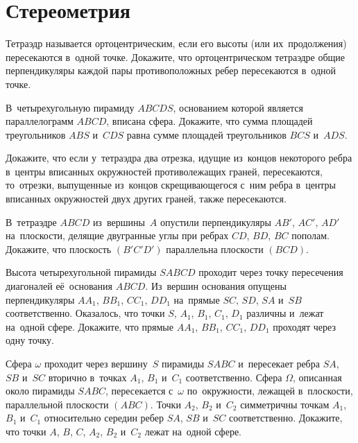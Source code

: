 
\section*{Стереометрия}


\begin{problems}

\item
Тетраэдр называется ортоцентрическим, если его высоты (или их~продолжения)
пересекаются в~одной точке.
Докажите, что ортоцентрическом тетраэдре общие перпендикуляры каждой пары
противоположных ребер пересекаются в~одной точке.

\item
В~четырехугольную пирамиду $ABCDS$, основанием которой является параллелограмм
$ABCD$, вписана сфера.
Докажите, что сумма площадей треугольников $ABS$ и~$CDS$ равна сумме площадей
треугольников $BCS$ и~$ADS$.

\item
Докажите, что если у~тетраэдра два отрезка, идущие из~концов некоторого ребра
в~центры вписанных окружностей противолежащих граней, пересекаются, то~отрезки,
выпущенные из~концов скрещивающегося с~ним ребра в~центры вписанных окружностей
двух других граней, также пересекаются.

\item
В~тетраэдре $ABCD$ из~вершины~$A$ опустили перпендикуляры $AB'$, $AC'$, $AD'$
на~плоскости, делящие двугранные углы при ребрах $CD$, $BD$, $BC$ пополам.
Докажите, что плоскость $(B'C'D')$ параллельна плоскости $(BCD)$.

\item
Высота четырехугольной пирамиды $SABCD$ проходит через точку пересечения
диагоналей её~основания $ABCD$.
Из~вершин основания опущены перпендикуляры $A A_1$, $B B_1$, $C C_1$, $D D_1$
на~прямые $SC$, $SD$, $SA$ и~$SB$ соответственно.
Оказалось, что точки $S$, $A_1$, $B_1$, $C_1$, $D_1$ различны и~лежат на~одной
сфере.
Докажите, что прямые $A A_1$, $B B_1$, $C C_1$, $D D_1$ проходят через одну
точку.

\item
Сфера $\omega$ проходит через вершину~$S$ пирамиды $SABC$ и~пересекает ребра
$SA$, $SB$ и~$SC$ вторично в~точках $A_1$, $B_1$ и~$C_1$ соответственно.
Сфера $\Omega$, описанная около пирамиды $SABC$, пересекается с~$\omega$
по~окружности, лежащей в~плоскости, параллельной плоскости $(ABC)$.
Точки $A_2$, $B_2$ и~$C_2$ симметричны точкам $A_1$, $B_1$ и~$C_1$ относительно
середин ребер $SA$, $SB$ и~$SC$ соответственно.
Докажите, что точки $A$, $B$, $C$, $A_2$, $B_2$ и~$C_2$ лежат на~одной сфере.


\end{problems}
